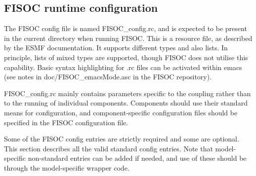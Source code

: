 \documentclass[12pt]{article}
\begin{document}
\subsection{FISOC runtime configuration}
\label{sec:config}

The FISOC config file is named FISOC\_config.rc, and is expected to be present 
in the current directory when running FISOC.  
This is a resource file, as described by the 
ESMF documentation.  It supports different types and also lists. 
In principle, lists of mixed types are supported, though FISOC does not utilise this capability.
Basic syntax highlighting for .rc files can be activated within emacs 
(see notes in doc/FISOC\_emacsMode.asc in the FISOC repository).

FISOC\_config.rc mainly contains parameters specific to the coupling rather than to the running of 
individual components.  
Components should use their standard means for configuration, and component-specific configuration files 
should be specified in the FISOC configuration file.

Some of the FISOC config entries are strictly required and some are optional.
This section describes all the valid standard config entries. 
Note that model-specific non-standard entries can be added if needed, and use of these 
should be through the model-specific wrapper code.
\end{document}
